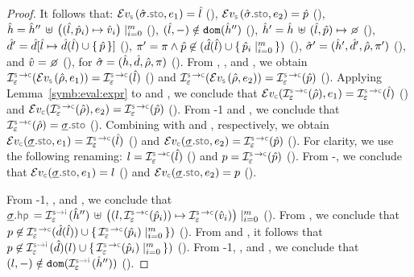 \begin{proof}
  \noindent {} It follows that: $\evalexpr{\symbolic}(\sstate.\stosel, \jsilexpr_1) = \sloc$ (), 
$\evalexpr{\symbolic}(\sstate.\stosel, \jsilexpr_2) = \sexprp$ (), 
$\hat{h} = \hat{h}'' \, \uplus \, \big((\hat{l}, \hat{p}_i) \mapsto \hat{v}_i \big)\mid_{i = 0}^m$ (), 
$(\hat{l},-) \notin \texttt{dom} (\hat{h}'')$  (), 
$\sheap' = \sheap \dunion (\sloc, \sexprp) \mapsto \none$ (),
$\hat{d}' = \hat{d}[\hat{l} \mapsto \hat{d}(\hat{l}) \cup \{ \, \hat{p} \, \}]$ (), 
$\pi' = \pi \wedge \hat{p} \not\in (\hat{d}(\hat{l}) \cup \{ \, \hat{p}_i \mid_{i=0}^m \, \})$ (), 
$\hat{\sigma}' = (\hat{h}', \hat{d}', \hat\rho, \pi')$ (), and 
$\sexprv = \none$ (), for $\hat{\sigma} = (\hat{h}, \hat{d}, \hat\rho, \pi)$ (). 
From , , and , we obtain 
 $\interpret{\symbconc}{\senv}(\evalexpr{\symbolic}(\sstore, \jsilexpr_1))= \interpret{\symbconc}{\senv}(\sloc)$ () 
 and 
 $\interpret{\symbconc}{\senv}(\evalexpr{\symbolic}(\sstore, \jsilexpr_2))= \interpret{\symbconc}{\senv}(\sexprp)$ (). 
 Applying Lemma~\ref{symb:eval:expr} to  and , we conclude that 
$\evalexpr{\concrete}(\interpret{\symbconc}{\senv}(\sstore), \jsilexpr_1) = \interpret{\symbconc}{\senv}(\sloc)$ ()
and 
$\evalexpr{\concrete}(\interpret{\symbconc}{\senv}(\sstore), \jsilexpr_2) = \interpret{\symbconc}{\senv}(\sexprp)$ ().
 From \hyp{1} and , we conclude that $\interpret{\symbconc}{\senv}(\sstore) = \istate.\stosel$ (). 
Combining  with  and , respectively, we obtain
 $\evalexpr{\concrete}(\istate.\stosel, \jsilexpr_1) = \interpret{\symbconc}{\senv}(\sloc)$ ()
and 
$\evalexpr{\concrete}(\istate.\stosel, \jsilexpr_2) = \interpret{\symbconc}{\senv}(\sexprp)$ ().
For clarity, we use the following renaming: $\loc = \interpret{\symbconc}{\senv}(\sloc)$ () and 
$p = \interpret{\symbconc}{\senv}(\sexprp)$ (). From -, we conclude 
that  $\evalexpr{\concrete}(\istate.\stosel, \jsilexpr_1) = \loc$ () and 
$\evalexpr{\concrete}(\istate.\stosel, \jsilexpr_2) = p$ ().

 \noindent From \hyp{1}, , and , we conclude that 
 $\istate.\hpsel = \interpret{\symbinst}{\senv}(\sheap'') \, \uplus  \, \big((\loc, \interpret{\symbconc}{\senv}(\sexprp_i)) \mapsto 
 \interpret{\symbconc}{\senv}(\sexprv_i) \big)\mid_{i = 0}^m$ ().
 From , we conclude that $p \not\in \interpret{\symbconc}{\senv}(\sdom(\sloc)) \cup \jsilset{\interpret{\symbconc}{\senv}(\sexprp_i) \mid_{i=0}^m})$ ().
 From  and , it follows that  
 $p \not\in \interpret{\symbinst}{\senv}(\sdom)(\loc) \cup \jsilset{\interpret{\symbconc}{\senv}(\sexprp_i) \mid_{i=0}^m})$ ().
  From \hyp{1}, , and , we conclude that $(\loc,-) \notin \domain (\interpret{\symbinst}{\senv}(\sheap''))$ (). 
  

\end{proof}
